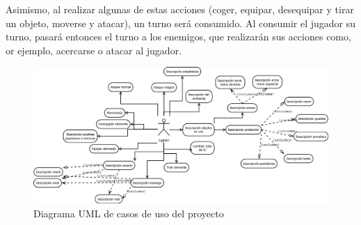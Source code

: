 \noindent Asimismo, al realizar algunas de estas acciones (coger, equipar, desequipar y tirar un objeto, moverse y atacar), un turno será consumido. Al consumir el jugador su turno, pasará entonces el turno a los enemigos, que realizarán sus acciones como, or ejemplo, acercarse o atacar al jugador.

\begin{figure}[h!]
    \centering
    \includegraphics[width=0.9\textheight,angle=90]{img/casosdeuso.png}
    \caption{Diagrama UML de casos de uso del proyecto}
    \label{fig:casosdeuso}
\end{figure}